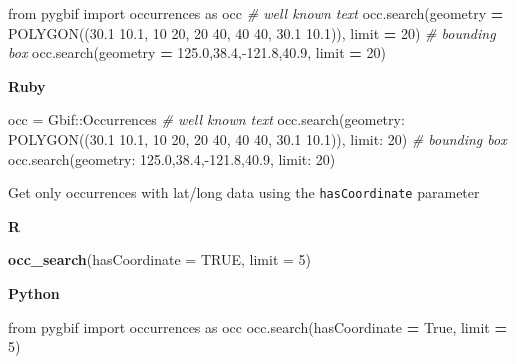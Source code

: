\documentclass[3p]{elsarticle} %
\newenvironment{Shaded}{\begin{snugshade}}{\end{snugshade}}
\newcommand{\CommentTok}[1]{\textcolor[rgb]{0.56,0.35,0.01}{\textit{#1}}}
\newcommand{\DataTypeTok}[1]{\textcolor[rgb]{0.13,0.29,0.53}{#1}}
\newcommand{\DecValTok}[1]{\textcolor[rgb]{0.00,0.00,0.81}{#1}}
\newcommand{\ImportTok}[1]{#1}
\newcommand{\KeywordTok}[1]{\textcolor[rgb]{0.13,0.29,0.53}{\textbf{#1}}}
\newcommand{\NormalTok}[1]{#1}
\newcommand{\OperatorTok}[1]{\textcolor[rgb]{0.81,0.36,0.00}{\textbf{#1}}}
\newcommand{\OtherTok}[1]{\textcolor[rgb]{0.56,0.35,0.01}{#1}}
\newcommand{\StringTok}[1]{\textcolor[rgb]{0.31,0.60,0.02}{#1}}
\newcommand{\VariableTok}[1]{\textcolor[rgb]{0.00,0.00,0.00}{#1}}
\begin{document}
\begin{Shaded}
\begin{Highlighting}[]
\ImportTok{from}\NormalTok{ pygbif }\ImportTok{import}\NormalTok{ occurrences }\ImportTok{as}\NormalTok{ occ}
\CommentTok{\# well known text}
\NormalTok{occ.search(geometry }\OperatorTok{=} \StringTok{\textquotesingle{}POLYGON((30.1 10.1, 10 20, 20 40, 40 40, 30.1 10.1))\textquotesingle{}}\NormalTok{, limit }\OperatorTok{=} \DecValTok{20}\NormalTok{)}
\CommentTok{\# bounding box}
\NormalTok{occ.search(geometry }\OperatorTok{=} \StringTok{\textquotesingle{}{-}125.0,38.4,{-}121.8,40.9\textquotesingle{}}\NormalTok{, limit }\OperatorTok{=} \DecValTok{20}\NormalTok{)}
\end{Highlighting}
\end{Shaded}

\textbf{Ruby}

\begin{Shaded}
\begin{Highlighting}[]
\NormalTok{occ = }\DataTypeTok{Gbif}\NormalTok{::}\DataTypeTok{Occurrences}
\CommentTok{\# well known text}
\NormalTok{occ.search(}\StringTok{geometry: \textquotesingle{}POLYGON((30.1 10.1, 10 20, 20 40, 40 40, 30.1 10.1))\textquotesingle{}}\NormalTok{, }\StringTok{limit: }\DecValTok{20}\NormalTok{)}
\CommentTok{\# bounding box}
\NormalTok{occ.search(}\StringTok{geometry: \textquotesingle{}{-}125.0,38.4,{-}121.8,40.9\textquotesingle{}}\NormalTok{, }\StringTok{limit: }\DecValTok{20}\NormalTok{)}
\end{Highlighting}
\end{Shaded}

Get only occurrences with lat/long data using the \texttt{hasCoordinate}
parameter

\textbf{R}

\begin{Shaded}
\begin{Highlighting}[]
\KeywordTok{occ\_search}\NormalTok{(}\DataTypeTok{hasCoordinate =} \OtherTok{TRUE}\NormalTok{, }\DataTypeTok{limit =} \DecValTok{5}\NormalTok{)}
\end{Highlighting}
\end{Shaded}

\textbf{Python}

\begin{Shaded}
\begin{Highlighting}[]
\ImportTok{from}\NormalTok{ pygbif }\ImportTok{import}\NormalTok{ occurrences }\ImportTok{as}\NormalTok{ occ}
\NormalTok{occ.search(hasCoordinate }\OperatorTok{=} \VariableTok{True}\NormalTok{, limit }\OperatorTok{=} \DecValTok{5}\NormalTok{)}
\end{Highlighting}
\end{Shaded}
\end{document}
